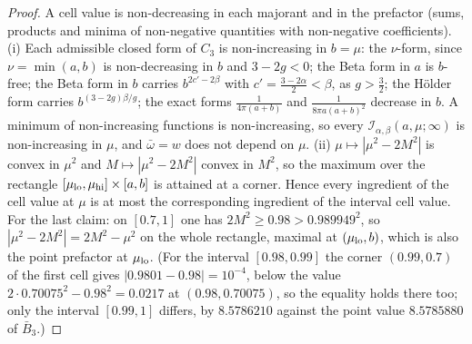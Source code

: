 \begin{proof}
A cell value is non-decreasing in each majorant and in the prefactor (sums, products and minima of non-negative quantities with non-negative coefficients). (i) Each admissible closed form of $C_3$ is non-increasing in $b=\mu$: the $\nu$-form, since $\nu=\min(a,b)$ is non-decreasing in $b$ and $3-2g<0$; the Beta form in $a$ is $b$-free; the Beta form in $b$ carries $b^{2c'-2\beta}$ with $c'=\frac{3-2\alpha}2<\beta$, as $g>\frac32$; the H\"older form carries $b^{(3-2g)\beta/g}$; the exact forms $\frac1{4\pi(a+b)}$ and $\frac1{8\pi a(a+b)^2}$ decrease in $b$. A minimum of non-increasing functions is non-increasing, so every $\mathcal I_{\alpha,\beta}(a,\mu;\infty)$ is non-increasing in $\mu$, and $\bar\omega=w$ does not depend on $\mu$. (ii) $\mu\mapsto|\mu^2-2M^2|$ is convex in $\mu^2$ and $M\mapsto|\mu^2-2M^2|$ convex in $M^2$, so the maximum over the rectangle $[\mu_{\rm lo},\mu_{\rm hi}]\times[a,b]$ is attained at a corner. Hence every ingredient of the cell value at $\mu$ is at most the corresponding ingredient of the interval cell value. For the last claim: on $[0.7,1]$ one has $2M^2\ge0.98>0.989949^2$, so $|\mu^2-2M^2|=2M^2-\mu^2$ on the whole rectangle, maximal at $(\mu_{\rm lo},b)$, which is also the point prefactor at $\mu_{\rm lo}$. (For the interval $[0.98,0.99]$ the corner $(0.99,0.7)$ of the first cell gives $|0.9801-0.98|=10^{-4}$, below the value $2\cdot0.70075^2-0.98^2=0.0217$ at $(0.98,0.70075)$, so the equality holds there too; only the interval $[0.99,1]$ differs, by $8.5786210$ against the point value $8.5785880$ of $\bar B_3$.)
\end{proof}

